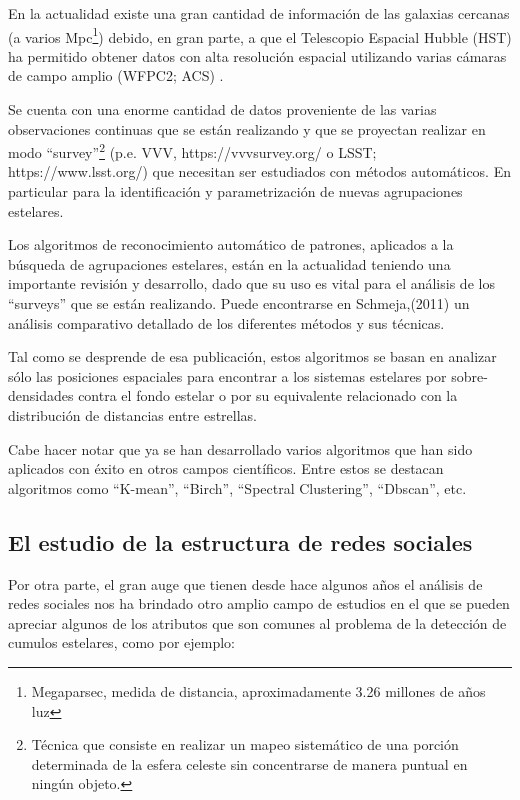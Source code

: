 \documentclass[
	11pt,oneside,a4paper,
	headsepline,footsepline,
	fleqn,
]{memoir}
\begin{document}
En la actualidad existe una gran cantidad de información de las galaxias cercanas (a varios Mpc\footnote{Megaparsec, medida de distancia, aproximadamente 3.26 millones de años luz}) debido, en gran parte, a que el Telescopio Espacial Hubble (HST) ha permitido obtener datos con alta resolución espacial utilizando varias cámaras de campo amplio (WFPC2; ACS) \cite{Dalcanton2009}.

Se cuenta con una enorme cantidad de datos proveniente de las varias observaciones continuas que se están realizando y que se proyectan realizar en modo “survey”\footnote{Técnica que consiste en realizar un mapeo sistemático de una porción determinada de la esfera celeste sin concentrarse de manera puntual en ningún objeto.} (p.e. VVV, https://vvvsurvey.org/ o LSST; https://www.lsst.org/) que necesitan ser estudiados con métodos automáticos. En particular para la identificación y parametrización de nuevas agrupaciones estelares.

Los algoritmos de reconocimiento automático de patrones, aplicados a la búsqueda de agrupaciones estelares, están en la actualidad teniendo una importante revisión y desarrollo, dado que su uso es vital para el análisis de los “surveys” que se están realizando. Puede encontrarse en Schmeja,(2011) \cite{Schmeja2011} un análisis comparativo detallado de los diferentes métodos y sus técnicas.

Tal como se desprende de esa publicación, estos algoritmos se basan en analizar sólo las posiciones espaciales para encontrar a los sistemas estelares por sobre-densidades contra el fondo estelar o por su equivalente relacionado con la distribución de distancias entre estrellas. 

Cabe hacer notar que ya se han desarrollado varios algoritmos que han sido aplicados con éxito en otros campos científicos. Entre estos se destacan algoritmos como “K-mean”, “Birch”, “Spectral Clustering”, “Dbscan”, etc.\cite{rodriguez2019clustering}

\subsection{El estudio de la estructura de redes sociales}

Por otra parte, el gran auge que tienen desde hace algunos años el análisis de redes sociales nos ha brindado otro amplio campo de estudios en el que se pueden apreciar algunos de los atributos que son comunes al problema de la detección de cumulos estelares, como por ejemplo:
\end{document}
